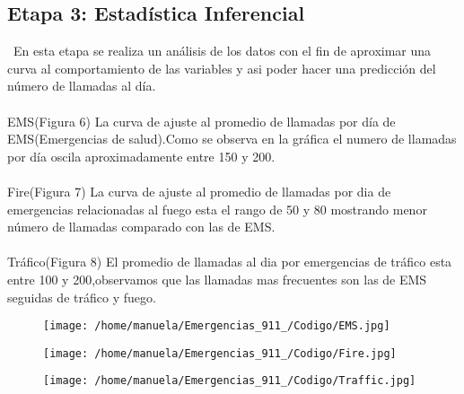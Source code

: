 \documentclass[11pt]{article}
\begin{document}
\subsection{Etapa 3: Estadística Inferencial}
\
En esta etapa se realiza un análisis  de los datos con el fin de aproximar una curva al  comportamiento de las variables y asi poder hacer una predicción del número de llamadas al día.\\
\\
EMS(Figura 6)
La curva de ajuste al promedio de llamadas por día de EMS(Emergencias de salud).Como se observa en la gráfica el numero de llamadas por día oscila aproximadamente entre 150 y 200.
\\
\\
Fire(Figura 7)
La curva de ajuste al promedio de llamadas por dia de emergencias relacionadas al fuego esta el rango de 50 y 80 mostrando  menor número de llamadas comparado con las de EMS.
\\
\\
Tráfico(Figura 8)
El promedio de llamadas al dia por emergencias de tráfico esta entre 100 y 200,observamos que las llamadas mas frecuentes son las de EMS seguidas de tráfico y fuego.
\begin{figure}[htp]
\centering
\texttt{[image: /home/manuela/Emergencias\_911\_/Codigo/EMS.jpg]}
\caption{}
\label{}
\end{figure}

\begin{figure}[htp]
\centering
\texttt{[image: /home/manuela/Emergencias\_911\_/Codigo/Fire.jpg]}
\caption{}
\label{}
\end{figure}
\begin{figure}[htp]
\centering
\texttt{[image: /home/manuela/Emergencias\_911\_/Codigo/Traffic.jpg]}
\caption{}
\label{}
\end{figure}
\end{document}
